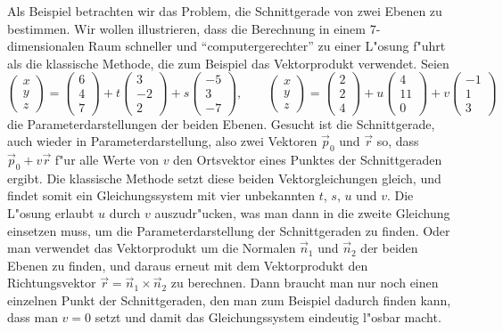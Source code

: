 Als Beispiel betrachten wir das Problem, die Schnittgerade von
zwei Ebenen zu bestimmen. Wir wollen illustrieren, dass die
Berechnung in einem 7-dimensionalen Raum schneller und
``computergerechter'' zu einer L"osung f"uhrt als die klassische
Methode, die zum Beispiel das Vektorprodukt verwendet.
Seien 
\begin{equation}
\begin{pmatrix}x\\y\\z\end{pmatrix}
=
\begin{pmatrix}6\\4\\7\end{pmatrix}
+t
\begin{pmatrix}3\\-2\\2\end{pmatrix}
+s
\begin{pmatrix}-5\\3\\-7\end{pmatrix}
,\qquad
\begin{pmatrix}x\\y\\z\end{pmatrix}
=
\begin{pmatrix}2\\2\\4\end{pmatrix}
+u
\begin{pmatrix}4\\11\\0\end{pmatrix}
+v
\begin{pmatrix}-1\\1\\3\end{pmatrix}
\label{zweiebenen}
\end{equation}
die Parameterdarstellungen der beiden Ebenen. Gesucht ist die
Schnittgerade, auch wieder in Parameterdarstellung, also
zwei Vektoren $\vec p_0$ und $\vec r$ so, dass $\vec p_0+v\vec r$
f"ur alle Werte von $v$ den Ortsvektor eines Punktes der
Schnittgeraden ergibt.
Die klassische Methode setzt diese beiden Vektorgleichungen
gleich, und findet somit ein Gleichungssystem mit vier unbekannten
$t$, $s$, $u$ und $v$. Die L"osung erlaubt $u$ durch $v$ auszudr"ucken,
was man dann in die zweite Gleichung einsetzen muss, um die Parameterdarstellung
der Schnittgeraden zu finden. Oder man verwendet das Vektorprodukt
um die Normalen $\vec n_1$ und $\vec n_2$ der beiden Ebenen zu finden, und daraus
erneut mit dem Vektorprodukt den Richtungsvektor
$\vec r=\vec n_1\times\vec n_2$ zu berechnen. Dann braucht man nur noch einen
einzelnen Punkt der Schnittgeraden, den man zum Beispiel dadurch finden kann,
dass man $v=0$ setzt und damit das Gleichungssystem eindeutig l"osbar
macht.

